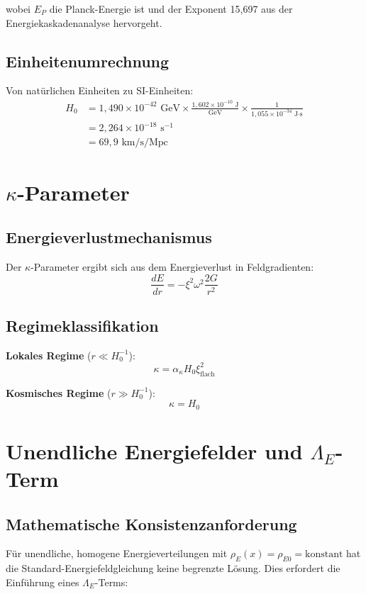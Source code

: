 \documentclass[12pt,a4paper]{article}
\begin{document}
	wobei $E_P$ die Planck-Energie ist und der Exponent 15{,}697 aus der Energiekaskadenanalyse hervorgeht.
	
	\subsection{Einheitenumrechnung}
	Von natürlichen Einheiten zu SI-Einheiten:
	\begin{align}
		H_0 &= 1{,}490 \times 10^{-42} \text{ GeV} \times \frac{1{,}602 \times 10^{-10} \text{ J}}{\text{GeV}} \times \frac{1}{1{,}055 \times 10^{-34} \text{ J·s}} \\
		&= 2{,}264 \times 10^{-18} \text{ s}^{-1} \\
		&= 69{,}9 \text{ km/s/Mpc}
	\end{align}
	
	\section{$\kappa$-Parameter}
	
	\subsection{Energieverlustmechanismus}
	Der $\kappa$-Parameter ergibt sich aus dem Energieverlust in Feldgradienten:
	\begin{equation}
		\frac{dE}{dr} = -\xi^2 \omega^2 \frac{2G}{r^2}
	\end{equation}
	
	\subsection{Regimeklassifikation}
	\textbf{Lokales Regime} ($r \ll H_0^{-1}$):
	\begin{equation}
		\kappa = \alpha_\kappa H_0 \xi_{\text{flach}}^2
	\end{equation}
	
	\textbf{Kosmisches Regime} ($r \gg H_0^{-1}$):
	\begin{equation}
		\boxed{\kappa = H_0}
	\end{equation}
	
	\section{Unendliche Energiefelder und $\Lambda_E$-Term}
	
	\subsection{Mathematische Konsistenzanforderung}
	Für unendliche, homogene Energieverteilungen mit $\rho_E(x) = \rho_{E0} = \text{konstant}$ hat die Standard-Energiefeldgleichung keine begrenzte Lösung. Dies erfordert die Einführung eines $\Lambda_E$-Terms:
	
\end{document}
